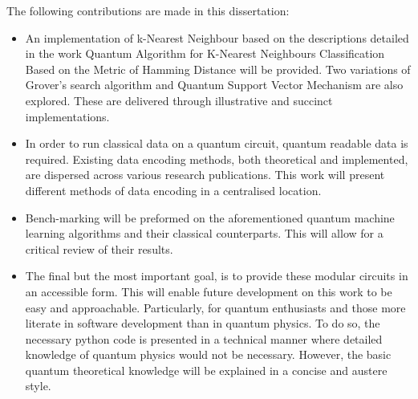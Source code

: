 The following contributions are made in this dissertation:


\begin{itemize}
\item  An implementation of k-Nearest Neighbour based on the descriptions detailed in the work Quantum Algorithm for K-Nearest Neighbours Classification Based on the Metric of Hamming Distance \cite{HammInstruct} will be provided. Two variations of Grover's search algorithm and Quantum Support Vector Mechanism are also explored. These are delivered through illustrative and succinct implementations. 

\end{itemize}

\begin{itemize}
\item In order to run classical data on a quantum circuit, quantum readable data is required. Existing data encoding methods, both theoretical and implemented, are dispersed across various research publications. This work will present different methods of data encoding in a centralised location.
\end{itemize}

\begin{itemize}
\item Bench-marking will be preformed on the aforementioned quantum machine learning algorithms and their classical counterparts. This will allow for a critical review of their results. 
\end{itemize}

\begin{itemize}
\item The final but the most important goal, is to provide these modular circuits in an accessible form. This will enable future development on this work to be easy and approachable. Particularly, for quantum enthusiasts and those more literate in software development than in quantum physics. To do so, the necessary python code is presented in a technical manner where detailed knowledge of quantum physics would not be necessary. However, the basic quantum theoretical knowledge will be explained in a concise and austere style.

\end{itemize}
